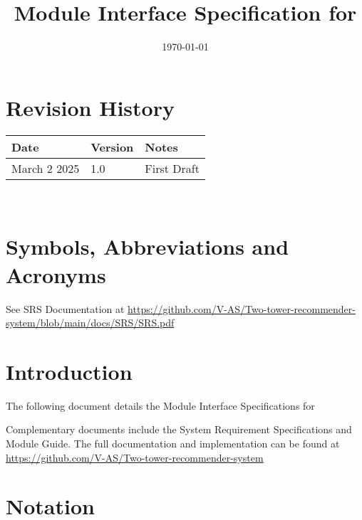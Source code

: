 \documentclass[12pt, titlepage]{article}
\begin{document}
\title{Module Interface Specification for \progname{}}

\author{\authname}

\date{\today}

\maketitle


\section{Revision History}

\begin{tabularx}{\textwidth}{p{3cm}p{2cm}X}
\toprule {\bf Date} & {\bf Version} & {\bf Notes}\\
\midrule
March 2 2025 & 1.0 & First Draft\\
\bottomrule
\end{tabularx}

~\newpage

\section{Symbols, Abbreviations and Acronyms}

See SRS Documentation at \url{https://github.com/V-AS/Two-tower-recommender-system/blob/main/docs/SRS/SRS.pdf}

\newpage

\tableofcontents

\newpage


\section{Introduction}

The following document details the Module Interface Specifications for
\progname

Complementary documents include the System Requirement Specifications
and Module Guide.  The full documentation and implementation can be
found at \url{https://github.com/V-AS/Two-tower-recommender-system}

\section{Notation}
\end{document}
